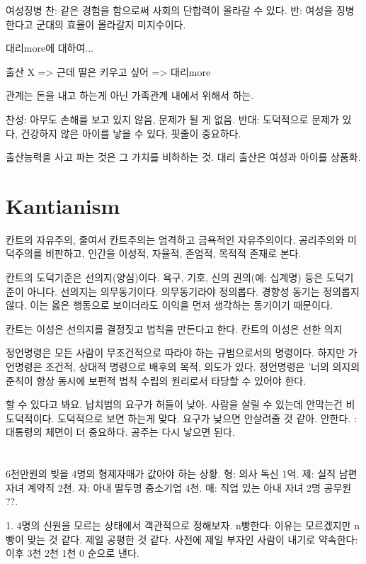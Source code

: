 여성징병
찬: 같은 경험을 함으로써 사회의 단합력이 올라갈 수 있다.
반: 여성을 징병한다고 군대의 효율이 올라갈지 미지수이다.




대리more에 대하여...

출산 X => 근데 딸은 키우고 싶어 => 대리more

관계는 돈을 내고 하는게 아닌 가족관계 내에서 위해서 하는.

찬성: 아무도 손해를 보고 있지 않음, 문제가 될 게 없음.
반대:  도덕적으로 문제가 있다, 건강하지 않은 아이를 낳을 수 있다,
핏줄이 중요하다.


출산능력을 사고 파는 것은 그 가치를 비하하는 것.
대리 출산은 여성과 아이를 상품화.

\newpage
\section{Kantianism}

칸트의 자유주의, 줄여서 칸트주의는 엄격하고 금욕적인 자유주의이다. 공리주의와
미덕주의를 비판하고, 인간을 이성적, 자율적, 존엄적, 목적적 존재로 본다.

칸트의 도덕기준은 선의지(양심)이다. 욕구, 기호, 신의 권의(예: 십계명) 등은
도덕기준이 아니다. 선의지는 의무동기이다. 의무동기라야 정의롭다. 경향성 동기는
정의롭지 않다. 이는 옳은 행동으로 보이더라도 이익을 먼저 생각하는 동기이기
때문이다.

칸트는 이성은 선의지를 결정짓고 법칙을 만든다고 한다. 칸트의 이성은 선한 의지

정언명령은 모든 사람이 무조건적으로 따라야 하는 규범으로서의 명령이다. 하지만
가언명령은 조건적, 상대적 명령으로 배후의 목적, 의도가 있다. 정언명령은 '너의
의지의 준칙이 항상 동시에 보편적 법칙 수립의 원리로서 타당할 수 있어야 한다.

할 수 있다고 봐요. 납치범의 요구가 허들이 낮아. 사람을 살릴 수 있는데 안막는건
비 도덕적이다. 도덕적으로 보면 하는게 맞다. 요구가 낮으면 안살려줄 것 같아.
안한다. : 대통령의 체면이 더 중요하다. 공주는 다시 낳으면 된다.


\section{}
6천만원의 빚을 4명의 형제자매가 값아야 하는 상황.
형: 의사 독신 1억.
제: 실직 남편 자녀 계약직 2천.
자: 아내 딸두명 중소기업 4천.
매: 직업 있는 아내 자녀 2명 공무원 ??.

1. 4명의 신원을 모르는 상태에서 객관적으로 정해보자.
n빵한다:
이유는 모르겠지만 n빵이 맞는 것 같다. 제일 공평한 것 같다.
사전에 제일 부자인 사람이 내기로 약속한다:
이후 3천 2천 1천 0 순으로 낸다.

